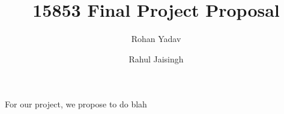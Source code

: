 \documentclass{article}
\author{
  Rohan Yadav\\
  \and
  Rahul Jaisingh\\
}
\title{15853 Final Project Proposal}
\date{}
\begin{document}
\maketitle

For our project, we propose to do blah
\end{document}
